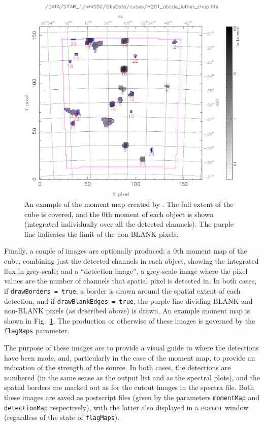 \begin{figure}[!t]
\begin{center}
\includegraphics[width=\textwidth]{example_moment_map}
\end{center}
\caption{\footnotesize An example of the moment map created by
  \duchamp. The full extent of the cube is covered, and the 0th moment
  of each object is shown (integrated individually over all the
  detected channels). The purple line indicates the limit of the
  non-BLANK pixels.}
\label{fig-moment}
\end{figure}

Finally, a couple of images are optionally produced: a 0th moment map
of the cube, combining just the detected channels in each object,
showing the integrated flux in grey-scale; and a ``detection image'',
a grey-scale image where the pixel values are the number of channels
that spatial pixel is detected in. In both cases, if
\texttt{drawBorders = true}, a border is drawn around the spatial
extent of each detection, and if \texttt{drawBlankEdges = true}, the
purple line dividing BLANK and non-BLANK pixels (as described above)
is drawn. An example moment map is shown in Fig.~\ref{fig-moment}.
The production or otherwise of these images is governed by the
\texttt{flagMaps} parameter.

The purpose of these images are to provide a visual guide to where the
detections have been made, and, particularly in the case of the moment
map, to provide an indication of the strength of the source. In both
cases, the detections are numbered (in the same sense as the output
list and as the spectral plots), and the spatial borders are marked
out as for the cutout images in the spectra file. Both these images
are saved as postscript files (given by the parameters
\texttt{momentMap} and \texttt{detectionMap} respectively), with the
latter also displayed in a \textsc{pgplot} window (regardless of the
state of \texttt{flagMaps}).
